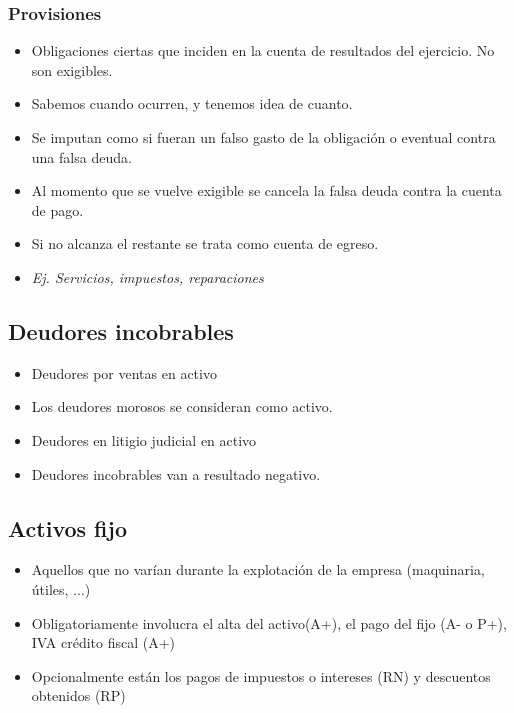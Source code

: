 \documentclass[titlepage,a4paper]{article}
\begin{document}
\subsubsection*{Provisiones}
\begin{itemize}
\item Obligaciones ciertas que inciden en la cuenta de resultados del ejercicio. No son exigibles.
\item Sabemos cuando ocurren, y tenemos idea de cuanto.
\item Se imputan como si fueran un falso gasto de la obligación o eventual contra una falsa deuda. 
\item Al momento que se vuelve exigible se cancela la falsa deuda contra la cuenta de pago.
\item Si no alcanza el restante se trata como cuenta de egreso.
\item \textit{Ej. Servicios, impuestos, reparaciones}
\end{itemize}


\subsection*{Deudores incobrables}
\begin{itemize}
\item Deudores por ventas en activo
\item Los deudores morosos se consideran como activo.
\item Deudores en litigio judicial en activo
\item Deudores incobrables van a resultado negativo.
\end{itemize}



\subsection*{Activos fijo}
\begin{itemize}
\item Aquellos que no varían durante la explotación de la empresa (maquinaria, útiles, ...)
\item Obligatoriamente involucra el alta del activo(A+), el pago del fijo (A- o P+), IVA crédito fiscal (A+)
\item Opcionalmente están los pagos de impuestos o intereses (RN) y descuentos obtenidos (RP)
\end{itemize}
\end{document}
